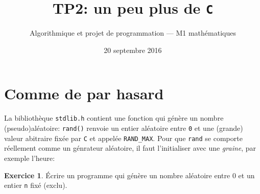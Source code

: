 \documentclass[french,a4paper]{article}
\title{\sffamily TP2: un peu plus de {\tt C}}
\date{20 septembre 2016}
\author{Algorithmique et projet de programmation --- M1 mathématiques}
\theoremstyle{definition}
\newtheorem{exercise}{Exercice}
\theoremstyle{remark}
\newcommand{\inlinec}[1]{\lstinline[style=C]°#1°}
\begin{document}
\maketitle

\section{Comme de par hasard}
\label{sec:random}

La bibliothèque \inlinec{stdlib.h} contient une fonction qui génère un
nombre (pseudo)aléatoire: \inlinec{rand()} renvoie un entier aléatoire
entre \inlinec{0} et une (grande) valeur abitraire fixée par {\tt C}
et appelée \inlinec{RAND_MAX}. Pour que \inlinec{rand} se comporte
réellement comme un génrateur aléatoire, il faut l'initialiser avec
une {\em graine}, par exemple l'heure: 

\begin{exercise}
  \'Ecrire un programme qui génère un nombre aléatoire entre 0 et un
  entier \inlinec{n} fixé (exclu).
\end{exercise}


\begin{exercice}
  
\end{exercice}
\end{document}
